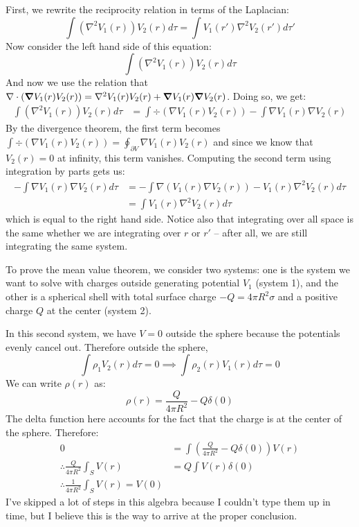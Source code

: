 \documentclass[10pt]{article}
\newcommand{\laplace}{\nabla^2}
\begin{document}
	\begin{solution}
		First, we rewrite the reciprocity relation in terms of the Laplacian:
		\[
			\int (\laplace V_1(r))V_2(r) d\tau = \int V_1(r')\laplace V_2(r') d\tau'
		\] 
		Now consider the left hand side of this equation:
		\[
		\int (\laplace V_1(r))V_2(r) d\tau
		\] 
		And now we use the relation that $\div(\grad V_1(r) V_2(r)) = \laplace V_1(r) V_2(r) + \grad V_1(r) 
		\grad V_2(r)$. Doing so, we get:
		\begin{align*}
			\int (\laplace V_1(r)) V_2(r) d\tau &=  \int \div(\nabla V_1(r) V_2(r)) - \int \nabla V_1(r) \nabla
			V_2(r)
		\end{align*}
		By the divergence theorem, the first term becomes $\int \div(\nabla V_1(r) V_2(r)) = \oint_{\partial V}
		\nabla V_1(r) V_2(r)$ and since we know that $V_2(r) = 0$ at infinity, this term vanishes. Computing the
		second term using integration by parts gets us:
		\begin{align*}
			-\int\nabla V_1(r) \nabla V_2(r) d\tau &= -\int \nabla(V_1(r) \nabla V_2(r)) -
			V_1(r) \laplace V_2(r) d\tau  \\
			&= \int V_1(r) \nabla^2V_2(r) d\tau
		\end{align*}
		which is equal to the right hand side. Notice also that integrating over all space is the same whether
		we are integrating over $r$ or $r'$ -- after all, we are still integrating the same system.

		To prove the mean value theorem, we consider two systems: one
		is the system we want to solve with charges outside generating potential $V_1$ (system 1),  and the
		other is a spherical shell with total surface
		charge $-Q = 4\pi R^2 \sigma$ and a positive charge $Q$ at the center (system 2). 
		
		In this second system, we have $V = 0$ outside the sphere because the potentials evenly cancel out. 
		Therefore outside the sphere,
		\[
		\int \rho_1V_2(r) d\tau = 0 \implies \int \rho_2(r) V_1(r) d\tau = 0
		\]
		We can write $\rho(r)$ as: 
		\[ \rho(r) = \frac{Q}{4\pi R^2} - Q\delta(0)\]
		The delta function here accounts for the fact that the charge is at the center of the sphere. Therefore: 
		\begin{align*}
			0 &=\int \left( \frac{Q}{4\pi R^2} - Q\delta(0)\right)V(r) \\
			\therefore \frac{Q}{4\pi R^2} \int_S V(r) &= Q \int V(r) \delta(0)\\
			\therefore \frac{1}{4\pi R^2} \int_S V(r) = V(0)
		\end{align*}
		I've skipped a lot of steps in this algebra because I couldn't type them up in time, but I believe this is the way to arrive at the proper conclusion.
	\end{solution}
	\pagebreak
\end{document}
